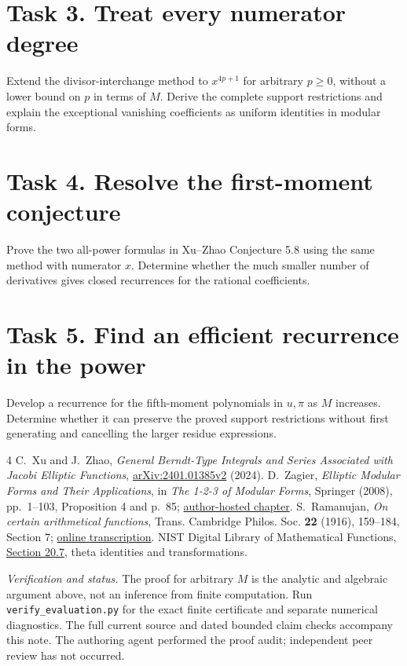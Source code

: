 \documentclass[11pt]{article}
\begin{document}
\section*{Task 3. Treat every numerator degree}
Extend the divisor-interchange method to $x^{4p+1}$ for arbitrary
$p\ge0$, without a lower bound on $p$ in terms of $M$. Derive the
complete support restrictions and explain the exceptional vanishing
coefficients as uniform identities in modular forms.

\section*{Task 4. Resolve the first-moment conjecture}
Prove the two all-power formulas in Xu--Zhao Conjecture 5.8 using
the same method with numerator $x$. Determine whether the much
smaller number of derivatives gives closed recurrences for the
rational coefficients.

\section*{Task 5. Find an efficient recurrence in the power}
Develop a recurrence for the fifth-moment polynomials in $u,\pi$
as $M$ increases. Determine whether it can preserve the proved
support restrictions without first generating and cancelling the
larger residue expressions.

\begin{thebibliography}{4}
 C.~Xu and J.~Zhao,
\emph{General Berndt-Type Integrals and Series Associated with Jacobi
Elliptic Functions},
\href{https://arxiv.org/abs/2401.01385v2}{arXiv:2401.01385v2} (2024).
 D.~Zagier, \emph{Elliptic Modular Forms and Their Applications},
in \emph{The 1-2-3 of Modular Forms}, Springer (2008), pp.~1--103,
Proposition 4 and p.~85;
\href{https://people.mpim-bonn.mpg.de/zagier/files/doi/10.1007/978-3-540-74119-0_1/fulltext.pdf}{author-hosted chapter}.
 S.~Ramanujan, \emph{On certain arithmetical functions},
Trans. Cambridge Philos. Soc. \textbf{22} (1916), 159--184,
Section 7; \href{https://ramanujan.sirinudi.org/Volumes/published/ram18.html}{online transcription}.
 NIST Digital Library of Mathematical Functions,
\href{https://dlmf.nist.gov/20.7}{Section 20.7}, theta identities
and transformations.
\end{thebibliography}
\noindent\textit{Verification and status.}
The proof for arbitrary $M$ is the analytic and algebraic argument
above, not an inference from finite computation. Run
\texttt{verify\_evaluation.py} for the exact finite certificate and
separate numerical diagnostics. The full current source and dated
bounded claim checks accompany this note. The authoring agent
performed the proof audit; independent peer review has not occurred.
\end{document}
